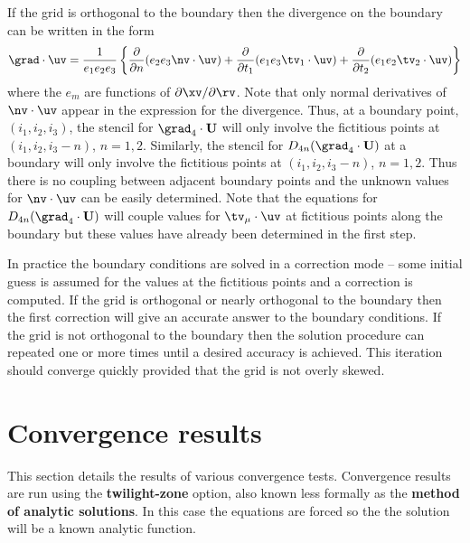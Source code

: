 \documentclass[12pt]{article}
\begin{document}
If the grid is orthogonal to the boundary then the divergence on the
boundary can be written in the form
$$
    \grad\cdot\uv = {1\over e_1 e_2 e_3} \left\{
          {\partial \over \partial n} ( e_2 e_3 \nv\cdot\uv )
        + {\partial \over \partial t_1} ( e_1 e_3 \tv_1 \cdot\uv )
        + {\partial \over \partial t_2} ( e_1 e_2 \tv_2 \cdot\uv )
              \right \}
$$
where the $e_m$ are functions of $\partial \xv / \partial \rv$.
Note that only normal
derivatives of $\nv\cdot\uv$ appear in the expression for the divergence.
Thus, at a boundary point, $(i_1,i_2,i_3)$, the stencil for
$\grad_4\cdot\uvd$
will only involve the fictitious points at
$(i_1,i_2,i_3-n)$, $n=1,2$.
Similarly, the stencil for
$D_{4n}(\grad_4\cdot\uvd)$ at a boundary
will only involve the fictitious points at
$(i_1,i_2,i_3-n)$, $n=1,2$.
Thus there is no coupling between adjacent boundary points and the
unknown values for $\nv\cdot\uv$ can be easily determined.  Note that
the equations for $D_{4n}(\grad_4\cdot\uvd)$ will couple values for
$\tv_\mu\cdot\uv$ at fictitious points along the boundary
but these values have already been determined in the first step.
 
In practice the boundary conditions are solved in a correction mode --
some initial guess is assumed for the values at the fictitious points
and a correction is computed.  If the grid is orthogonal or nearly
orthogonal to the boundary then the first correction will give an
accurate answer to the boundary conditions.  If the grid is not
orthogonal to the boundary then the solution procedure can repeated
one or more times until a desired accuracy is achieved. This
iteration should converge quickly provided that the grid is not overly
skewed.

\clearpage


\clearpage


\clearpage
\section{Convergence results}

This section details the results of various convergence tests. 
Convergence results are run using the {\bf twilight-zone} option, also
known less formally as the {\bf method of analytic solutions}.
In this case the equations are forced so the the solution will
be a known analytic function.
\end{document}
